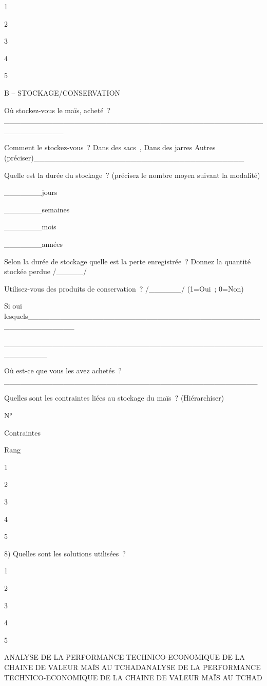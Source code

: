 \documentclass[12pt,oneside]{report}
\begin{document}
1

2

3

4

5

B – STOCKAGE/CONSERVATION

Où stockez-vous le maïs, acheté ?\_\_\_\_\_\_\_\_\_\_\_\_\_\_\_\_\_\_\_\_\_\_\_\_\_\_\_\_\_\_\_\_\_\_\_\_\_\_\_\_\_\_\_\_\_\_\_\_\_\_\_\_\_\_\_\_\_\_\_

Comment le stockez-vous ? Dans des sacs ,  Dans des jarres Autres (préciser)\_\_\_\_\_\_\_\_\_\_\_\_\_\_\_\_\_\_\_\_\_\_\_\_\_\_\_\_\_\_\_\_\_\_\_\_\_\_\_

Quelle est la durée du stockage ? (précisez le nombre moyen suivant la modalité)

\_\_\_\_\_\_\_jours

\_\_\_\_\_\_\_semaines

\_\_\_\_\_\_\_mois

\_\_\_\_\_\_\_années

Selon la durée de stockage quelle est la perte enregistrée ? Donnez la quantité stockée perdue  /\_\_\_\_\_/

Utilisez-vous des produits de conservation ? /\_\_\_\_\_\_/  (1=Oui ; 0=Non)

Si oui lesquels\_\_\_\_\_\_\_\_\_\_\_\_\_\_\_\_\_\_\_\_\_\_\_\_\_\_\_\_\_\_\_\_\_\_\_\_\_\_\_\_\_\_\_\_\_\_\_\_\_\_\_\_\_\_\_\_

\_\_\_\_\_\_\_\_\_\_\_\_\_\_\_\_\_\_\_\_\_\_\_\_\_\_\_\_\_\_\_\_\_\_\_\_\_\_\_\_\_\_\_\_\_\_\_\_\_\_\_\_\_\_\_\_

Où est-ce que vous les avez achetés ? \_\_\_\_\_\_\_\_\_\_\_\_\_\_\_\_\_\_\_\_\_\_\_\_\_\_\_\_\_\_\_\_\_\_\_\_\_\_\_\_\_\_\_\_\_\_\_

Quelles sont les contraintes liées au stockage du maïs ? (Hiérarchiser)

N°

Contraintes

Rang

1

2

3

4

5

8) Quelles sont les solutions utilisées ?

1

2

3

4

5

ANALYSE DE LA PERFORMANCE TECHNICO-ECONOMIQUE DE LA CHAINE DE VALEUR  MAÏS AU TCHADANALYSE DE LA PERFORMANCE TECHNICO-ECONOMIQUE DE LA CHAINE DE VALEUR  MAÏS AU TCHAD
\end{document}

